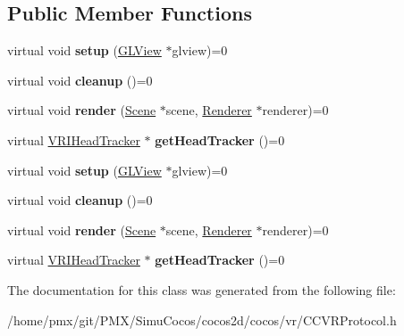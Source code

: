 \subsection*{Public Member Functions}
\begin{DoxyCompactItemize}
\item 
\mbox{\label{classVRIRenderer_aab98d2a2eaa76c41e503b503571360c1}} 
virtual void {\bfseries setup} (\hyperlink{classGLView}{G\+L\+View} $\ast$glview)=0
\item 
\mbox{\label{classVRIRenderer_ae211d016243f635bf5264549c3355e8a}} 
virtual void {\bfseries cleanup} ()=0
\item 
\mbox{\label{classVRIRenderer_aaf352eb0545600c75a6362deb6d5e821}} 
virtual void {\bfseries render} (\hyperlink{classScene}{Scene} $\ast$scene, \hyperlink{classRenderer}{Renderer} $\ast$renderer)=0
\item 
\mbox{\label{classVRIRenderer_abb4a420e3d59dec1a843895d00a596a2}} 
virtual \hyperlink{classVRIHeadTracker}{V\+R\+I\+Head\+Tracker} $\ast$ {\bfseries get\+Head\+Tracker} ()=0
\item 
\mbox{\label{classVRIRenderer_aab98d2a2eaa76c41e503b503571360c1}} 
virtual void {\bfseries setup} (\hyperlink{classGLView}{G\+L\+View} $\ast$glview)=0
\item 
\mbox{\label{classVRIRenderer_ae211d016243f635bf5264549c3355e8a}} 
virtual void {\bfseries cleanup} ()=0
\item 
\mbox{\label{classVRIRenderer_aaf352eb0545600c75a6362deb6d5e821}} 
virtual void {\bfseries render} (\hyperlink{classScene}{Scene} $\ast$scene, \hyperlink{classRenderer}{Renderer} $\ast$renderer)=0
\item 
\mbox{\label{classVRIRenderer_abb4a420e3d59dec1a843895d00a596a2}} 
virtual \hyperlink{classVRIHeadTracker}{V\+R\+I\+Head\+Tracker} $\ast$ {\bfseries get\+Head\+Tracker} ()=0
\end{DoxyCompactItemize}


The documentation for this class was generated from the following file\+:\begin{DoxyCompactItemize}
\item 
/home/pmx/git/\+P\+M\+X/\+Simu\+Cocos/cocos2d/cocos/vr/C\+C\+V\+R\+Protocol.\+h\end{DoxyCompactItemize}
